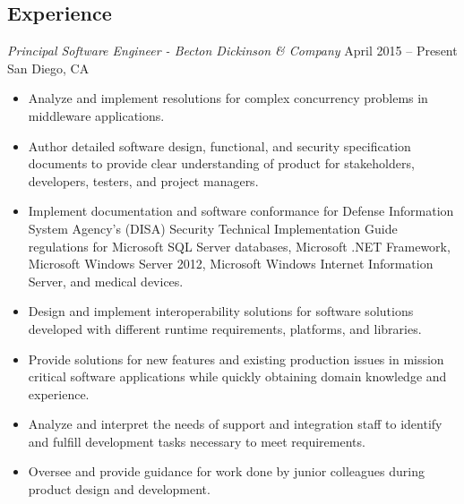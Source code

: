 \documentclass[10pt]{res} %
\begin{document}
\begin{resume}
\section{Experience} 

\vspace{8pt} %

{\sl Principal Software Engineer - Becton Dickinson \& Company} \hfill April 2015 -- Present \\
San Diego, CA 
\begin{itemize} \itemsep -2pt %
\item Analyze and implement resolutions for complex concurrency problems in middleware applications.
\item Author detailed software design, functional, and security specification documents to provide clear understanding of product for stakeholders, developers, testers, and project managers.
\item Implement documentation and software conformance for Defense Information System Agency's (DISA) Security Technical Implementation Guide regulations for Microsoft SQL Server databases, Microsoft .NET Framework, Microsoft Windows Server 2012, Microsoft Windows Internet Information Server, and medical devices.
\item Design and implement interoperability solutions for software solutions developed with different runtime requirements, platforms, and libraries.
\item Provide solutions for new features and existing production issues in mission critical software applications while quickly obtaining domain knowledge and experience.  
\item Analyze and interpret the needs of support and integration staff to identify and fulfill development tasks necessary to meet requirements.
\item Oversee and provide guidance for work done by junior colleagues during product design and development.
\end{itemize}


\end{resume}
\end{document}
